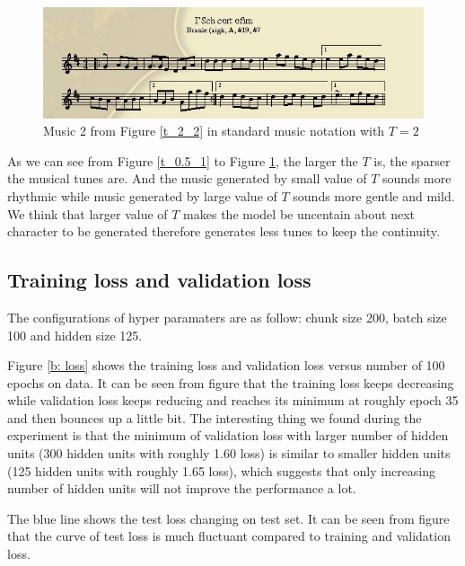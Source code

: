 \documentclass{article}
\begin{document}
\begin{figure}[H]
\begin{center}
  \centering
  \includegraphics[width=4.5in]{image/t_2_2_nota.png}
\end{center}
\caption{Music 2 from Figure \ref{t_2_2} in standard music notation with $T=2$}
\label{t_2_nota_2}
\end{figure}

As we can see from Figure \ref{t_0.5_1} to Figure \ref{t_2_nota_2}, the larger the $T$ is, the sparser the musical tunes are. And the music generated by small value of $T$ sounds more rhythmic while music generated by large value of $T$ sounds more gentle and mild. We think that larger value of $T$ makes the model be uncentain about next character to be generated therefore generates less tunes to keep the continuity.

\subsection{Training loss and validation loss}

The configurations of hyper paramaters are as follow: chunk size 200, batch size 100 and hidden size 125.

Figure \ref{b: loss} shows the training loss and validation loss versus number of 100 epochs on data. It can be seen from figure that the training loss keeps decreasing while validation loss keeps reducing and reaches its minimum at roughly epoch 35 and then bounces up a little bit. The interesting thing we found during the experiment is that the minimum of validation loss with larger number of hidden units (300 hidden units with roughly 1.60 loss) is similar to smaller hidden units (125 hidden units with roughly 1.65 loss), which suggests that only increasing number of hidden units will not improve the performance a lot.

The blue line shows the test loss changing on test set. It can be seen from figure that the curve of test loss is much fluctuant compared to training and validation loss.
\end{document}
